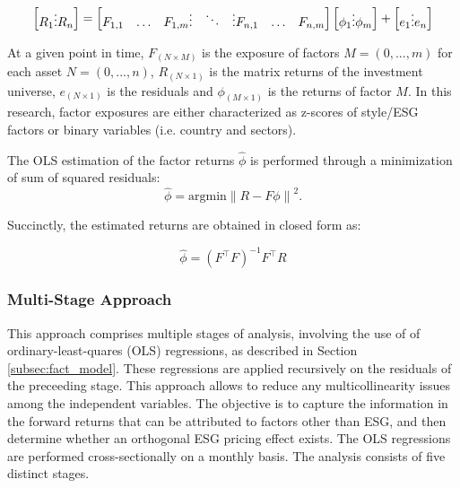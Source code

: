 \documentclass[11pt,a4paper]{article}
\let\\=\relax %
\begin{document}
\begin{equation}
    \begin{bmatrix} 
    R_{1}\\
    \vdots \\
    R_{n}
    \end{bmatrix}
    =
    \begin{bmatrix} 
    F_{1,1} & \dots  & F_{1,m}\\
    \vdots & \ddots & \vdots\\
    F_{n,1} & \dots  & F_{n,m} 
    \end{bmatrix}
    \begin{bmatrix} 
    \phi_{1}\\
    \vdots \\
    \phi_{m}
    \end{bmatrix}
    +
    \begin{bmatrix} 
    e_{1}\\
    \vdots \\
    e_{n}
    \end{bmatrix}
\end{equation}

At a given point in time, $F_{(N \times M)}$ is the exposure of factors $M={(0, ..., m)}$ for each asset $N={(0, ..., n)}$, $R_{(N \times 1)}$ is the matrix returns of the investment universe, $e_{(N \times 1)}$ is the residuals and $\phi_{(M \times 1)}$ is the returns of factor $M$. 
In this research, factor exposures are either characterized as z-scores of style/ESG factors or binary variables (i.e. country and sectors). 
 
The OLS estimation of the factor returns $\hat{\phi}$ is performed through a minimization of sum of squared residuals:
\begin{equation}
    \hat{\phi} = \mathrm{argmin} \left\| R - F \phi \right\|^2.
\end{equation}

Succinctly, the estimated returns are obtained in closed form as:

\begin{equation}
    \hat{\phi} = (F^\top F)^{-1} F^\top R
\end{equation}

\subsubsection{Multi-Stage Approach}\label{sec:multistage_model}

This approach comprises multiple stages of analysis, involving the use of of ordinary-least-quares (OLS) regressions, as described in Section \ref{subsec:fact_model}. 
These regressions are applied recursively on the residuals of the preceeding stage. 
This approach allows to reduce any multicollinearity issues among the independent variables. 
The objective is to capture the information in the forward returns that can be attributed to factors other than ESG, and then determine whether an orthogonal ESG pricing effect exists. 
The OLS regressions are performed cross-sectionally on a monthly basis. 
The analysis consists of five distinct stages.
	
\end{document}
